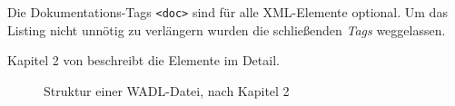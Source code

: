 Die Dokumentations-Tags \texttt{<doc>} sind für alle XML-Elemente optional.
Um das Listing nicht unnötig zu verlängern wurden die schließenden \emph{Tags} weggelassen.

Kapitel 2 von \cite{hadleyWADL} beschreibt die Elemente im Detail.

\newpage
\begin{figure}[!htb]
    \centering
    \resizebox{\textwidth}{!}{
        
    }
    \caption{Struktur einer WADL-Datei, nach Kapitel 2 \cite{hadleyWADL}}
    \label{fig:wadlstructure}
\end{figure}